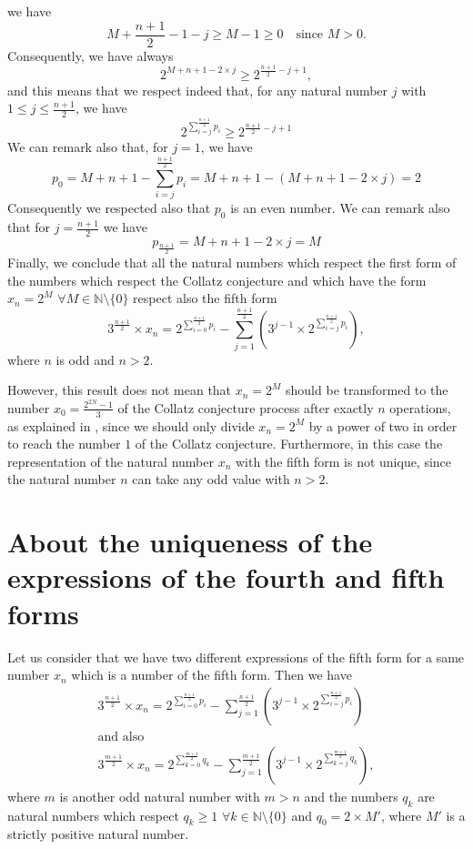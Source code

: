 \documentclass[11pt,a4paper]{article}
\newcommand{\N}{\mathbb{N}}
\newcommand{\Pf}[4]{2^{\sum_{#4=0}^{#1}#3_{#4}}-\sum_{j=1}^{#2}\left(3^{j-1}\times 2^{\sum_{#4=j}^{#1}#3_{#4}}\right)}
\theoremstyle{definition}
\begin{document}
we have
\begin{equation}
M+\frac{n+1}{2}-1-j\ge M-1\ge 0\quad\text{since }M>0.
\end{equation}
Consequently, we have always
\begin{equation}
2^{M+n+1-2\times j}\ge 2^{\frac{n+1}{2}-j+1},
\end{equation}
and this means that we respect indeed that, for any natural number $j$ with
$1\le j\le\frac{n+1}{2}$, we have
\begin{equation}
2^{\sum_{i=j}^{\frac{n+1}{2}}p_i}\ge 2^{\frac{n+1}{2}-j+1}
\end{equation}
We can remark also that, for $j=1$, we have
\begin{equation}
p_0=M+n+1-\sum_{i=j}^{\frac{n+1}{2}}p_i=M+n+1-(M+n+1-2\times j)=2
\end{equation}
Consequently we respected also that $p_0$ is an even number. We can remark also that for
$j=\frac{n+1}{2}$ we have
\begin{equation}
p_{\frac{n+1}{2}}=M+n+1-2\times j=M
\end{equation}
Finally, we conclude that all the natural numbers which respect the first form of the
numbers which respect the Collatz conjecture and which have the form $x_n=2^{M}$
$\forall M\in\N\setminus\{0\}$ respect also the fifth form
\[3^{\frac{n+1}{2}}\times x_n=\Pf{\frac{n+1}{2}}{\frac{n+1}{2}}{p}{i},\]
where $n$ is odd and $n>2$.

However, this result does not mean that $x_n=2^{M}$ should be transformed to the number
$x_0=\frac{2^{2N}-1}{3}$ of the Collatz conjecture process after exactly $n$ operations,
as explained in \citep{Louiz2024}, since we should only divide $x_n=2^{M}$ by a power of two
in order to reach the number $1$ of the Collatz conjecture. Furthermore, in this case the
representation of the natural number $x_n$ with the fifth form is not unique, since the
natural number $n$ can take any odd value with $n>2$.

\section{About the uniqueness of the expressions of the fourth and fifth forms}\label{sec:uniq}
Let us consider that we have two different expressions of the fifth form for a same
number $x_n$ which is a number of the fifth form. Then we have
\begin{gather*}
3^{\frac{n+1}{2}}\times x_n=\Pf{\frac{n+1}{2}}{\frac{n+1}{2}}{p}{i}\\
\text{and also}\\
3^{\frac{m+1}{2}}\times x_n=\Pf{\frac{m+1}{2}}{\frac{m+1}{2}}{q}{k},
\end{gather*}
where $m$ is another odd natural number with $m>n$ and the numbers $q_k$ are natural
numbers which respect $q_k\ge 1$ $\forall k\in\N\setminus\{0\}$ and $q_0=2\times M'$,
where $M'$ is a strictly positive natural number.
\end{document}
